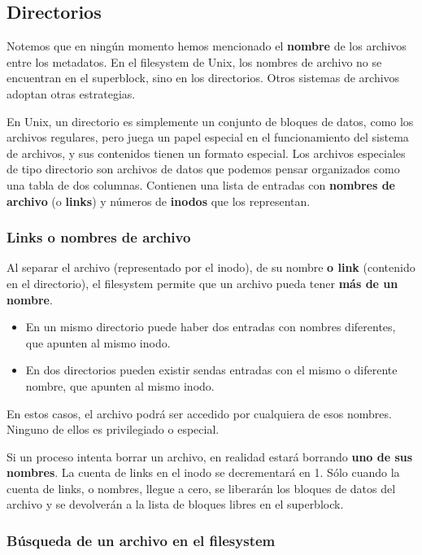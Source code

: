 \documentclass[spanish,A4,]{article}
\begin{document}
\subsection{Directorios}\label{directorios-1}

Notemos que en ningún momento hemos mencionado el \textbf{nombre} de los
archivos entre los metadatos. En el filesystem de Unix, los nombres de
archivo no se encuentran en el superblock, sino en los directorios.
Otros sistemas de archivos adoptan otras estrategias.

En Unix, un directorio es simplemente un conjunto de bloques de datos,
como los archivos regulares, pero juega un papel especial en el
funcionamiento del sistema de archivos, y sus contenidos tienen un
formato especial. Los archivos especiales de tipo directorio son
archivos de datos que podemos pensar organizados como una tabla de dos
columnas. Contienen una lista de entradas con \textbf{nombres de
archivo} (o \textbf{links}) y números de \textbf{inodos} que los
representan.

\subsubsection{Links o nombres de
archivo}\label{links-o-nombres-de-archivo}

Al separar el archivo (representado por el inodo), de su nombre
\textbf{o link} (contenido en el directorio), el filesystem permite que
un archivo pueda tener \textbf{más de un nombre}.

\begin{itemize}
\itemsep1pt\parskip0pt
\item
  En un mismo directorio puede haber dos entradas con nombres
  diferentes, que apunten al mismo inodo.
\item
  En dos directorios pueden existir sendas entradas con el mismo o
  diferente nombre, que apunten al mismo inodo.
\end{itemize}

En estos casos, el archivo podrá ser accedido por cualquiera de esos
nombres. Ninguno de ellos es privilegiado o especial.

Si un proceso intenta borrar un archivo, en realidad estará borrando
\textbf{uno de sus nombres}. La cuenta de links en el inodo se
decrementará en 1. Sólo cuando la cuenta de links, o nombres, llegue a
cero, se liberarán los bloques de datos del archivo y se devolverán a la
lista de bloques libres en el superblock.

\subsubsection{Búsqueda de un archivo en el
filesystem}\label{buxfasqueda-de-un-archivo-en-el-filesystem}
\end{document}
